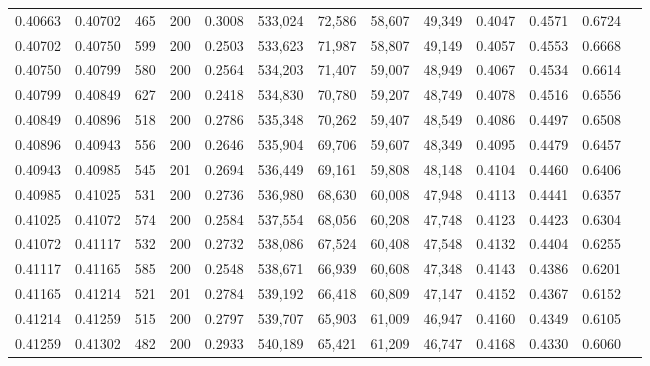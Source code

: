 \begin{tabular}{rrrrrrrrrrrrr}
0.40663 & 0.40702 &    465 & 200 &                                     0.3008 & 533,024 &  72,586 &  58,607 &  49,349 & 0.4047 & 0.4571 & 0.6724 \\
0.40702 & 0.40750 &    599 & 200 &                                     0.2503 & 533,623 &  71,987 &  58,807 &  49,149 & 0.4057 & 0.4553 & 0.6668 \\
0.40750 & 0.40799 &    580 & 200 &                                     0.2564 & 534,203 &  71,407 &  59,007 &  48,949 & 0.4067 & 0.4534 & 0.6614 \\
0.40799 & 0.40849 &    627 & 200 &                                     0.2418 & 534,830 &  70,780 &  59,207 &  48,749 & 0.4078 & 0.4516 & 0.6556 \\
0.40849 & 0.40896 &    518 & 200 &                                     0.2786 & 535,348 &  70,262 &  59,407 &  48,549 & 0.4086 & 0.4497 & 0.6508 \\
0.40896 & 0.40943 &    556 & 200 &                                     0.2646 & 535,904 &  69,706 &  59,607 &  48,349 & 0.4095 & 0.4479 & 0.6457 \\
0.40943 & 0.40985 &    545 & 201 &                                     0.2694 & 536,449 &  69,161 &  59,808 &  48,148 & 0.4104 & 0.4460 & 0.6406 \\
0.40985 & 0.41025 &    531 & 200 &                                     0.2736 & 536,980 &  68,630 &  60,008 &  47,948 & 0.4113 & 0.4441 & 0.6357 \\
0.41025 & 0.41072 &    574 & 200 &                                     0.2584 & 537,554 &  68,056 &  60,208 &  47,748 & 0.4123 & 0.4423 & 0.6304 \\
0.41072 & 0.41117 &    532 & 200 &                                     0.2732 & 538,086 &  67,524 &  60,408 &  47,548 & 0.4132 & 0.4404 & 0.6255 \\
0.41117 & 0.41165 &    585 & 200 &                                     0.2548 & 538,671 &  66,939 &  60,608 &  47,348 & 0.4143 & 0.4386 & 0.6201 \\
0.41165 & 0.41214 &    521 & 201 &                                     0.2784 & 539,192 &  66,418 &  60,809 &  47,147 & 0.4152 & 0.4367 & 0.6152 \\
0.41214 & 0.41259 &    515 & 200 &                                     0.2797 & 539,707 &  65,903 &  61,009 &  46,947 & 0.4160 & 0.4349 & 0.6105 \\
0.41259 & 0.41302 &    482 & 200 &                                     0.2933 & 540,189 &  65,421 &  61,209 &  46,747 & 0.4168 & 0.4330 & 0.6060 \\

\end{tabular}
